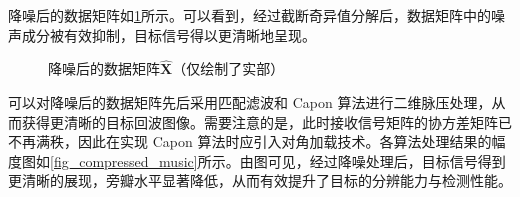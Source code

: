 \begin{solution}
    降噪后的数据矩阵如\cref{fig_denoised}所示。可以看到，经过截断奇异值分解后，数据矩阵中的噪声成分被有效抑制，目标信号得以更清晰地呈现。
    \begin{figure}[htb!]
        \centering
        \caption{降噪后的数据矩阵\( \hat{\mathbf{X}} \)（仅绘制了实部）}
        \label{fig_denoised}
    \end{figure}

    可以对降噪后的数据矩阵先后采用匹配滤波和 Capon 算法进行二维脉压处理，从而获得更清晰的目标回波图像。需要注意的是，此时接收信号矩阵的协方差矩阵已不再满秩，因此在实现 Capon 算法时应引入对角加载技术。各算法处理结果的幅度图如\cref{fig_compressed_music}所示。由图可见，经过降噪处理后，目标信号得到更清晰的展现，旁瓣水平显著降低，从而有效提升了目标的分辨能力与检测性能。


\end{solution}
